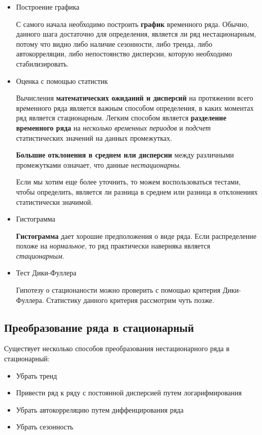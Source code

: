 \documentclass[aps,%
12pt,%
final,%
oneside,
onecolumn,%
musixtex, %
superscriptaddress,%
centertags]{article} %
\theoremstyle{plain}
\theoremstyle{definition}
\theoremstyle{remark}
\begin{document}
\begin{itemize}
	\item Построение графика

	С самого начала необходимо построить \textbf{график} временного ряда. Обычно, данного шага достаточно для определения, является ли ряд нестационарным, потому что видно либо наличие сезонности, либо тренда, либо автокорреляции, либо непостоянство дисперсии, которую необходимо стабилизировать.
	\item Оценка с помощью статистик

	Вычисления \textbf{математических ожиданий и дисперсий} на протяжении всего временного ряда является важным способом определения, в каких моментах ряд является стационарным. Легким способом является \textbf{разделение временного ряда} на \textit{несколько временных периодов} и \textit{подсчет} статистических значений на данных промежутках.

	\textbf{Большие отклонения в среднем или дисперсии} между различными промежутками означает, что данные \textit{нестационарны}. 

	Если мы хотим еще более уточнить, то можем воспользоваться тестами, чтобы определить, является ли разница в среднем или разница в отклонениях статистически значимой.
	\item Гистограмма

	\textbf{Гистограмма} дает хорошие предположения о виде ряда. Если распределение похоже на \textit{нормальное}, то ряд практически наверняка является \textit{стационарным}.
	\item Тест Дики-Фуллера

	Гипотезу о стационаности можно проверить с помощью критерия Дики-Фуллера. Статистику данного критерия рассмотрим чуть позже.
\end{itemize}

\newpage
\subsection{Преобразование ряда в стационарный}

Существует несколько способов преобразования нестационарного ряда в стационарный:

\begin{itemize}
	\item Убрать тренд
	\item Привести ряд к ряду с постоянной дисперсией путем логарифмирования
	\item Убрать автокорреляцию путем диффенцирования ряда
	\item Убрать сезонность
\end{itemize}
\end{document}
